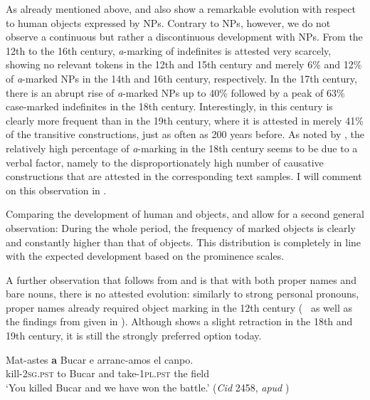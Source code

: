 \documentclass[output=paper]{LSP/langsci}
\begin{document}
As already mentioned above,  and  also show a remarkable evolution with respect to human objects expressed by  NPs. Contrary to  NPs, however, we do not observe a continuous but rather a discontinuous development with  NPs. From the 12th to the 16th century, \textit{a}-marking of indefinites is attested very scarcely, showing no relevant tokens in the 12th and 15th century and merely 6\% and 12\% of \textit{a}-marked NPs in the 14th and 16th century, respectively. In the 17th century, there is an abrupt rise of \textit{a}-marked NPs up to 40\% followed by a peak of 63\% case-marked indefinites in the 18th century. Interestingly,  in this century is clearly more frequent than in the 19th century, where it is attested in merely 41\% of the transitive constructions, \ie just as often as 200 years before. As noted by \citet[460]{Laca2006Objeto}, the relatively high percentage of \textit{a}-marking in the 18th century seems to be due to a verbal factor, namely to the disproportionately high number of causative constructions that are attested in the corresponding text samples. I will comment on this observation in . 

Comparing the development of human  and  objects,  and  allow for a second general observation: During the whole period, the frequency of marked  objects is clearly and constantly higher than that of  objects. This distribution is completely in line with the expected development based on the prominence scales. 

A further observation that follows from  and  is that with both proper names and bare nouns, there is no attested evolution: similarly to strong personal pronouns, proper names already required object marking in the 12th century (\cf~ as well as the findings from \citealt[207]{Company2002Grammaticalization} given in ). Although  shows a slight retraction in the 18th and 19th century, it is still the strongly preferred option today. 

\ea \label{08-ga-ex:10}
\gll Mat-astes \textbf{a} Bucar e arranc-amos el canpo.\\
kill-\textsc{2sg.pst} to Bucar and take-\textsc{1pl.pst} the field\\
\glt ‘You killed Bucar and we have won the battle.’
 (\textit{Cid} 2458, \textit{apud} \citealt[447]{Laca2006Objeto})
\z
\end{document}
